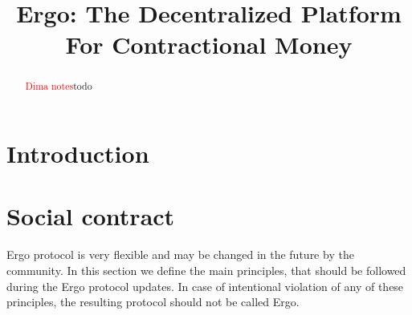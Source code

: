 \documentclass[]{article}
\newcommand{\dnote}[1]{{\textcolor{red}{Dima notes}}{#1}}
\begin{document}
    \title{Ergo: The Decentralized Platform For Contractional Money}


    \maketitle

    \begin{abstract}
        \dnote{todo}
    \end{abstract}



    \section{Introduction}


    \section{Social contract}

    Ergo protocol is very flexible and may be changed in the future by the community.
    In this section we define the main principles, that should be followed during the Ergo protocol updates.
    In case of intentional violation of any of these principles, the resulting protocol should not
    be called Ergo.
\end{document}
